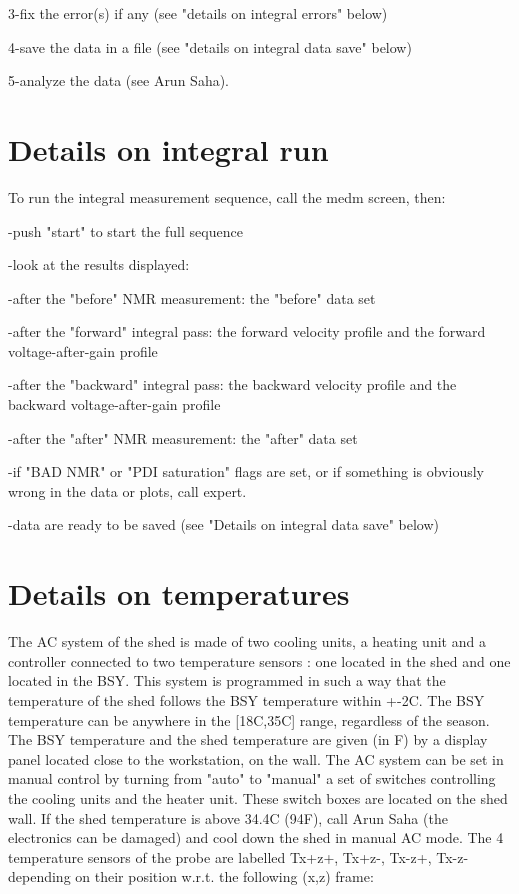 {3-fix the error(s) if any (see "details on integral errors"
below) 

4-save the data in a file (see "details on integral data save"
below) 

5-analyze the data (see Arun Saha). 


\section{Details on integral run }

To run the integral measurement sequence, call the 
medm screen, then: 

-push "start" to start the full sequence 

-look at the results displayed: 

-after the "before" NMR measurement: the 
"before"
data set 

-after the "forward" integral pass: the forward velocity profile
and the forward voltage-after-gain profile 

-after the "backward" integral pass: the backward velocity
profile and the backward voltage-after-gain profile 

-after the "after" NMR measurement: the 
"after"
data set 

-if "BAD NMR" or "PDI saturation" flags
are set, or if something is obviously wrong in the data or plots, call expert. 

-data are ready to be saved (see "Details on integral data save"
below) 


\section{Details on temperatures }

The AC system of the shed is made of two cooling units, a heating unit and a
controller connected to two temperature sensors : one located in the shed and
one located in the BSY. This system is programmed in such a way that the 
temperature
of the shed follows the BSY temperature within +-2C. The BSY temperature can
be anywhere in the {[}18C,35C{]} range, regardless of the season. The BSY 
temperature
and the shed temperature are given (in F) by a display panel located close to
the workstation, on the wall. The AC system can be set in manual control by
turning from "auto" to "manual" a set of
switches controlling the cooling units and the heater unit. These switch boxes
are located on the shed wall. If the shed temperature is above 34.4C (94F),
call Arun Saha (the electronics can be damaged) and cool down the shed in manual
AC mode. The 4 temperature sensors of the probe are labelled Tx+z+, Tx+z-, Tx-z+,
Tx-z- depending on their position w.r.t. the following (x,z) frame: 

}
